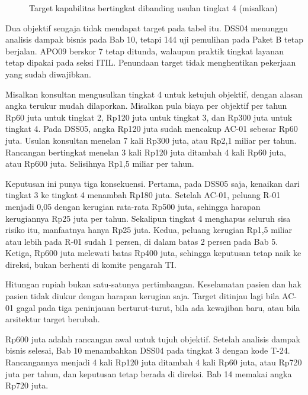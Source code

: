 \begin{figure}[!htb]
  \centering
  
  \caption{Target kapabilitas bertingkat dibanding usulan tingkat 4 (misalkan)}
  \label{fig:ch08-target-bertingkat}
\end{figure}

Dua objektif sengaja tidak mendapat target pada tabel itu. DSS04 menunggu analisis dampak bisnis
pada Bab 10, tetapi 144 uji pemulihan pada Paket B tetap berjalan. APO09 berskor 7 tetap
ditunda, walaupun praktik tingkat layanan tetap dipakai pada seksi ITIL. Penundaan target tidak
menghentikan pekerjaan yang sudah diwajibkan.

\begin{kasus}[title={Kasus Medikara Health: Usulan Tingkat 4 untuk Semua Objektif}]
Misalkan konsultan mengusulkan tingkat 4 untuk ketujuh objektif, dengan alasan angka terukur
mudah dilaporkan. Misalkan pula biaya per objektif per tahun Rp60 juta untuk tingkat 2, Rp120
juta untuk tingkat 3, dan Rp300 juta untuk tingkat 4. Pada DSS05, angka Rp120 juta sudah
mencakup AC-01 sebesar Rp60 juta. Usulan konsultan menelan 7 kali Rp300 juta, atau Rp2,1 miliar
per tahun. Rancangan bertingkat menelan 3 kali Rp120 juta ditambah 4 kali Rp60 juta, atau Rp600
juta. Selisihnya Rp1,5 miliar per tahun.

Keputusan ini punya tiga konsekuensi. Pertama, pada DSS05 saja, kenaikan dari tingkat 3 ke
tingkat 4 menambah Rp180 juta. Setelah AC-01, peluang R-01 menjadi 0,05 dengan kerugian
rata-rata Rp500 juta, sehingga harapan kerugiannya Rp25 juta per tahun. Sekalipun tingkat 4
menghapus seluruh sisa risiko itu, manfaatnya hanya Rp25 juta. Kedua, peluang kerugian Rp1,5
miliar atau lebih pada R-01 sudah 1 persen, di dalam batas 2 persen pada Bab 5. Ketiga, Rp600
juta melewati batas Rp400 juta, sehingga keputusan tetap naik ke direksi, bukan berhenti di
komite pengarah TI.

Hitungan rupiah bukan satu-satunya pertimbangan. Keselamatan pasien dan hak pasien tidak diukur
dengan harapan kerugian saja. Target ditinjau lagi bila AC-01 gagal pada tiga peninjauan
berturut-turut, bila ada kewajiban baru, atau bila arsitektur target berubah.

Rp600 juta adalah rancangan awal untuk tujuh objektif. Setelah analisis dampak bisnis selesai, Bab
10 menambahkan DSS04 pada tingkat 3 dengan kode T-24. Rancangannya menjadi 4 kali Rp120 juta
ditambah 4 kali Rp60 juta, atau Rp720 juta per tahun, dan keputusan tetap berada di direksi. Bab 14
memakai angka Rp720 juta.
\end{kasus}


